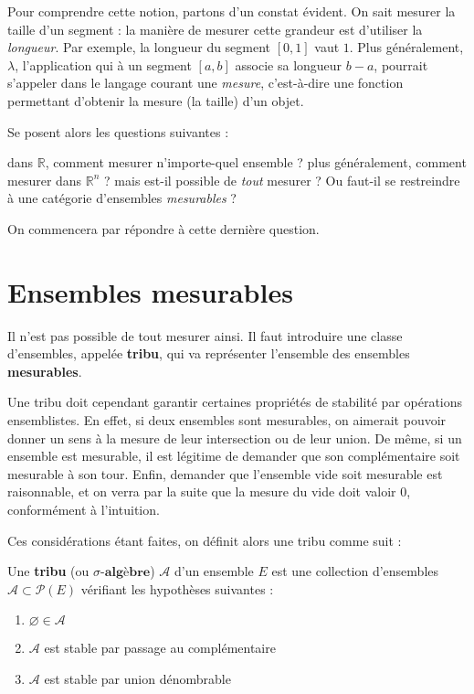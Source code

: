 \documentclass[../integ-proba.tex]{subfiles}
\begin{document}
Pour comprendre cette notion, partons d'un constat évident. On sait mesurer la taille d'un segment : la manière de mesurer cette grandeur est d'utiliser la \textit{longueur}.
Par exemple, la longueur du segment $\left[0,1\right]$ vaut $1$.
Plus généralement, $\lambda$, l'application qui à un segment $\left[a,b\right]$ associe sa longueur $b-a$, pourrait s'appeler dans le langage courant une \textit{mesure}, c'est-à-dire une fonction permettant d'obtenir la mesure (la taille) d'un objet.

Se posent alors les questions suivantes :
\begin{itemize}
  \itemb dans $\mathbb{R}$, comment mesurer n'importe-quel ensemble ?
  \itemb plus généralement, comment mesurer dans $\mathbb{R}^n$ ?
  \itemb mais est-il possible de \textit{tout} mesurer ? Ou faut-il se restreindre à une catégorie d'ensembles \textit{mesurables} ?
\end{itemize}

On commencera par répondre à cette dernière question.

\section{Ensembles mesurables}

Il n'est pas possible de tout mesurer ainsi. Il faut introduire une classe d'ensembles, appelée \textbf{tribu}, qui va représenter l'ensemble des ensembles \textbf{mesurables}.

Une tribu doit cependant garantir certaines propriétés de stabilité par opérations ensemblistes.
En effet, si deux ensembles sont mesurables, on aimerait pouvoir donner un sens à la mesure de leur intersection ou de leur union.
De même, si un ensemble est mesurable, il est légitime de demander que son complémentaire soit mesurable à son tour.
Enfin, demander que l'ensemble vide soit mesurable est raisonnable, et on verra par la suite que la mesure du vide doit valoir $0$, conformément à l'intuition.

Ces considérations étant faites, on définit alors une tribu comme suit :

\begin{defi}
  Une \textbf{tribu} (ou $\sigma\textbf{-algèbre}$) $\mathcal{A}$ d'un ensemble $E$ est une collection d'ensembles $\mathcal{A} \subset \mathcal{P}(E)$ vérifiant les hypothèses suivantes :
  \begin{enumerate}
    \item $\varnothing \in \mathcal{A}$
    \item $\mathcal{A}$ est stable par passage au complémentaire
    \item $\mathcal{A}$ est stable par union dénombrable
  \end{enumerate}
\end{defi}
\end{document}
